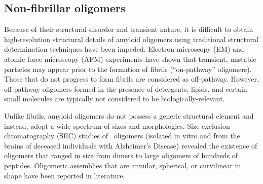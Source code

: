 

\subsection{Non-fibrillar oligomers}

Because of their structural disorder and transient nature, it is difficult to obtain high-resolution structural details of amyloid oligomers using traditional structural determination techniques have been impeded. Electron microscopy (EM) and atomic force microscopy (AFM) experiments have shown that transient, unstable particles may appear prior to the formation of fibrils (``on-pathway'' oligomers).\cite{Chromy:2003p2575,Ahmed:2010p5694,Caughey:2003jq} Those that do not progress to form fibrils are considered as off-pathway.\cite{Kayed:2003en} However, off-pathway oligomers formed in the presence of detergents, lipids, and certain small molecules are typically not considered to be biologically-relevant.\cite{Yu:2009p2873,Laurents:2005ki}

Unlike fibrils, amyloid oligomers do not possess a generic structural element and instead, adopt a wide spectrum of sizes and morphologies. Size exclusion chromatography (SEC) studies of \ oligomers (isolated in vitro and from the brains of deceased individuals with Alzheimer's Disease) revealed the existence of oligomers that ranged in size from dimers to large oligomers of hundreds of peptides.\cite{Haass:2007db,Walsh:2007fu} Oligomeric assemblies that are annular, spherical, or curvilinear in shape have been reported in literature.\cite{Haass:2007db,Kim:2009p2715,Lashuel:2002eg}

